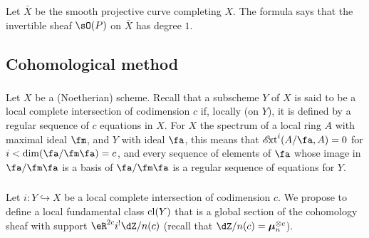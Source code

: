 Let $\bar X$ be the smooth projective curve completing $X$. The formula says
that the invertible sheaf $\sO(P)$ on $\bar X$ has degree $1$.











\subsection{Cohomological method}\label{IV:2-2}






\subsubsection{}\label{IV:2-2-1}

Let $X$ be a (Noetherian) scheme. Recall that a subscheme $Y$ of $X$ is said
to be a local complete intersection of codimension $c$ if, locally (on $Y$),
it is defined by a regular sequence of $c$ equations in $X$. For $X$ the
spectrum of a local ring $A$ with maximal ideal $\fm$, and $Y$ with ideal
$\fa$, this means that $\Ext^i(A/\fa,A) = 0$ for
$i<\dim(\fa/\fm\fa)=c$, and every sequence of elements of $\fa$ whose image
in $\fa/\fm\fa$ is a basis of $\fa/\fm\fa$ is a regular sequence of
equations for $Y$.






\subsubsection{}\label{IV:2-2-2}

Let $i:Y\hookrightarrow X$ be a local complete intersection of codimension
$c$. We propose to define a local fundamental class $\operatorname{cl}(Y)$ that is a
global section of the cohomology sheaf with support
$\eR^{2c}i^! \dZ/n(c)$ (recall that $\dZ/n(c)=\dmu_n^{\otimes c}$).

